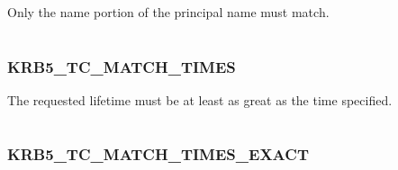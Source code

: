 \documentclass[letterpaper,10pt,english]{sphinxmanual}
\begin{document}
\begin{fulllineitems}
\label{appdev/refs/macros/KRB5_TC_MATCH_SRV_NAMEONLY:KRB5_TC_MATCH_SRV_NAMEONLY}
\end{fulllineitems}


Only the name portion of the principal name must match.

\begin{tabulary}{\linewidth}{|L|L|}
\hline

 & 
\\
\hline\end{tabulary}



\subsubsection{KRB5\_TC\_MATCH\_TIMES}
\label{appdev/refs/macros/KRB5_TC_MATCH_TIMES:krb5-tc-match-times}\label{appdev/refs/macros/KRB5_TC_MATCH_TIMES:krb5-tc-match-times-data}\label{appdev/refs/macros/KRB5_TC_MATCH_TIMES::doc}

\begin{fulllineitems}
\label{appdev/refs/macros/KRB5_TC_MATCH_TIMES:KRB5_TC_MATCH_TIMES}
\end{fulllineitems}


The requested lifetime must be at least as great as the time specified.

\begin{tabulary}{\linewidth}{|L|L|}
\hline

 & 
\\
\hline\end{tabulary}



\subsubsection{KRB5\_TC\_MATCH\_TIMES\_EXACT}
\label{appdev/refs/macros/KRB5_TC_MATCH_TIMES_EXACT:krb5-tc-match-times-exact-data}\label{appdev/refs/macros/KRB5_TC_MATCH_TIMES_EXACT::doc}\label{appdev/refs/macros/KRB5_TC_MATCH_TIMES_EXACT:krb5-tc-match-times-exact}

\begin{fulllineitems}
\label{appdev/refs/macros/KRB5_TC_MATCH_TIMES_EXACT:KRB5_TC_MATCH_TIMES_EXACT}
\end{fulllineitems}
\end{document}
